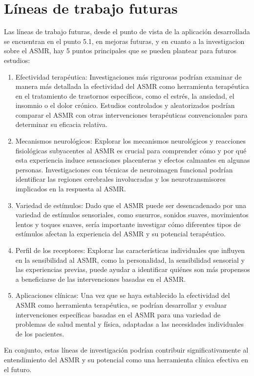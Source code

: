 \documentclass[a4paper,12pt,twoside]{memoir}
\begin{document}
\chapter{Líneas de trabajo futuras}
Las líneas de trabajo futuras, desde el punto de vista de la aplicación desarrollada se encuentran en el punto 5.1, en mejoras futuras, y en cuanto a la investigacion sobre el ASMR, hay 5 puntos principales que se pueden plantear para futuros estudios:
\begin{enumerate}
    \item Efectividad terapéutica: Investigaciones más rigurosas podrían examinar de manera más detallada la efectividad del ASMR como herramienta terapéutica en el tratamiento de trastornos específicos, como el estrés, la ansiedad, el insomnio o el dolor crónico. Estudios controlados y aleatorizados podrían comparar el ASMR con otras intervenciones terapéuticas convencionales para determinar su eficacia relativa.
    \item Mecanismos neurológicos: Explorar los mecanismos neurológicos y reacciones fisiológicas subyacentes al ASMR es crucial para comprender cómo y por qué esta experiencia induce sensaciones placenteras y efectos calmantes en algunas personas. Investigaciones con técnicas de neuroimagen funcional podrían identificar las regiones cerebrales involucradas y los neurotransmisores implicados en la respuesta al ASMR.
    \item Variedad de estímulos: Dado que el ASMR puede ser desencadenado por una variedad de estímulos sensoriales, como susurros, sonidos suaves, movimientos lentos y toques suaves, sería importante investigar cómo diferentes tipos de estímulos afectan la experiencia del ASMR y su potencial terapéutico.
    \item Perfil de los receptores: Explorar las características individuales que influyen en la sensibilidad al ASMR, como la personalidad, la sensibilidad sensorial y las experiencias previas, puede ayudar a identificar quiénes son más propensos a beneficiarse de las intervenciones basadas en el ASMR.
    \item Aplicaciones clínicas: Una vez que se haya establecido la efectividad del ASMR como herramienta terapéutica, se podrían desarrollar y evaluar intervenciones específicas basadas en el ASMR para una variedad de problemas de salud mental y física, adaptadas a las necesidades individuales de los pacientes.

\end{enumerate}
En conjunto, estas líneas de investigación podrían contribuir significativamente al entendimiento del ASMR y su potencial como una herramienta clínica efectiva en el futuro.



\end{document}
